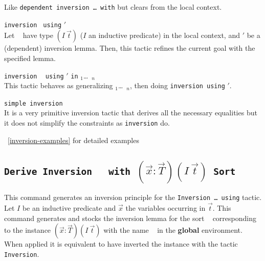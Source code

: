 \begin{Variants}
  Like \texttt{dependent inversion \dots\ with} but clears \ident from
  the local context.
\item \texttt{inversion} \ident \texttt{ using} \ident$'$ \\
  Let \ident~ have type $(I~\vec{t})$ ($I$ an inductive
  predicate) in the local context, and \ident$'$ be a (dependent) inversion
  lemma. Then, this tactic refines the current goal with the specified
  lemma.
\item \texttt{inversion} \ident~ \texttt{using} \ident$'$ 
  \texttt{in} \ident$_1$\dots\ \ident$_n$\\
  This tactic behaves as generalizing \ident$_1$\dots\ \ident$_n$,
  then doing \texttt{inversion}\ident~\texttt{using} \ident$'$.
\item \texttt{simple inversion} \ident~\\
  It is a very primitive inversion tactic that derives all the necessary
  equalities  but it does not simplify the  constraints as
  \texttt{inversion} do.
\end{Variants}

\SeeAlso~\ref{inversion-examples} for detailed examples

\subsection{\tt Derive Inversion \ident~ with
  $(\vec{x}:\vec{T})(I~\vec{t})$ Sort \sort}
\label{Derive-Inversion}

This command generates an inversion principle for the
\texttt{Inversion \dots\ using} tactic.
Let $I$ be an inductive predicate and $\vec{x}$ the variables
occurring in $\vec{t}$. This command generates and stocks the
inversion lemma for the sort \sort~ corresponding to the instance
$(\vec{x}:\vec{T})(I~\vec{t})$ with the name \ident~ in the {\bf
global} environment. When applied it is equivalent to have inverted
the instance with the tactic {\tt Inversion}.

